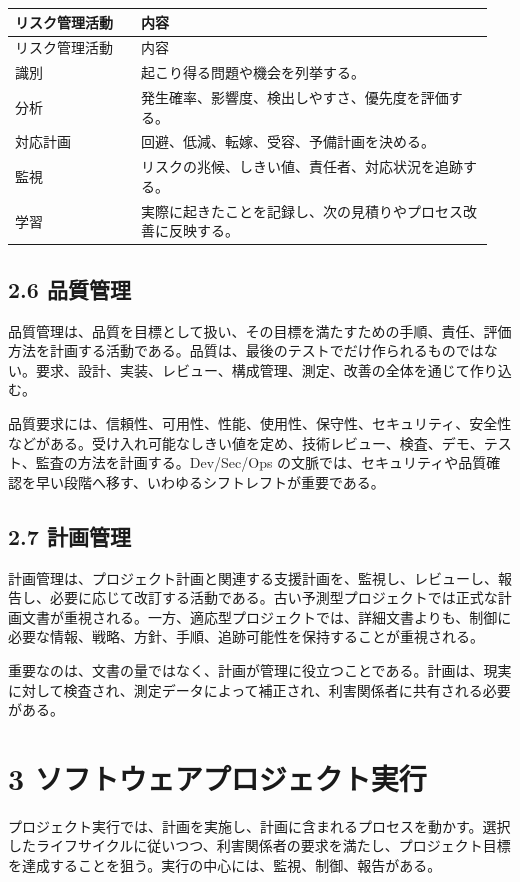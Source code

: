 \documentclass[a4paper,11pt]{ltjsarticle}
\begin{document}
\begin{longtable}{>{\raggedright\arraybackslash}p{0.25\linewidth}>{\raggedright\arraybackslash}p{0.70\linewidth}}
\toprule
リスク管理活動 & 内容 \\
\midrule
\endfirsthead
\toprule
リスク管理活動 & 内容 \\
\midrule
\endhead
識別 & 起こり得る問題や機会を列挙する。 \\
分析 & 発生確率、影響度、検出しやすさ、優先度を評価する。 \\
対応計画 & 回避、低減、転嫁、受容、予備計画を決める。 \\
監視 & リスクの兆候、しきい値、責任者、対応状況を追跡する。 \\
学習 & 実際に起きたことを記録し、次の見積りやプロセス改善に反映する。 \\
\bottomrule
\end{longtable}

\subsection{2.6 品質管理}
品質管理は、品質を目標として扱い、その目標を満たすための手順、責任、評価方法を計画する活動である。品質は、最後のテストでだけ作られるものではない。要求、設計、実装、レビュー、構成管理、測定、改善の全体を通じて作り込む。

品質要求には、信頼性、可用性、性能、使用性、保守性、セキュリティ、安全性などがある。受け入れ可能なしきい値を定め、技術レビュー、検査、デモ、テスト、監査の方法を計画する。Dev/Sec/Ops の文脈では、セキュリティや品質確認を早い段階へ移す、いわゆるシフトレフトが重要である。

\subsection{2.7 計画管理}
計画管理は、プロジェクト計画と関連する支援計画を、監視し、レビューし、報告し、必要に応じて改訂する活動である。古い予測型プロジェクトでは正式な計画文書が重視される。一方、適応型プロジェクトでは、詳細文書よりも、制御に必要な情報、戦略、方針、手順、追跡可能性を保持することが重視される。

重要なのは、文書の量ではなく、計画が管理に役立つことである。計画は、現実に対して検査され、測定データによって補正され、利害関係者に共有される必要がある。

\section{3 ソフトウェアプロジェクト実行}
プロジェクト実行では、計画を実施し、計画に含まれるプロセスを動かす。選択したライフサイクルに従いつつ、利害関係者の要求を満たし、プロジェクト目標を達成することを狙う。実行の中心には、監視、制御、報告がある。
\end{document}
